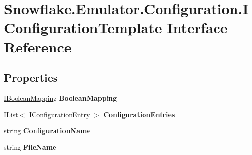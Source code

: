 \hypertarget{interface_snowflake_1_1_emulator_1_1_configuration_1_1_i_configuration_template}{}\section{Snowflake.\+Emulator.\+Configuration.\+I\+Configuration\+Template Interface Reference}
\label{interface_snowflake_1_1_emulator_1_1_configuration_1_1_i_configuration_template}
\subsection*{Properties}
\begin{DoxyCompactItemize}
\item 
\hypertarget{interface_snowflake_1_1_emulator_1_1_configuration_1_1_i_configuration_template_a4e057a915e16197d47e69fece7a6887c}{}\hyperlink{interface_snowflake_1_1_emulator_1_1_configuration_1_1_i_boolean_mapping}{I\+Boolean\+Mapping} {\bfseries Boolean\+Mapping}\label{interface_snowflake_1_1_emulator_1_1_configuration_1_1_i_configuration_template_a4e057a915e16197d47e69fece7a6887c}

\item 
\hypertarget{interface_snowflake_1_1_emulator_1_1_configuration_1_1_i_configuration_template_ae0e14f8c693702f9eb36937a451c5586}{}I\+List$<$ \hyperlink{interface_snowflake_1_1_emulator_1_1_configuration_1_1_i_configuration_entry}{I\+Configuration\+Entry} $>$ {\bfseries Configuration\+Entries}\label{interface_snowflake_1_1_emulator_1_1_configuration_1_1_i_configuration_template_ae0e14f8c693702f9eb36937a451c5586}

\item 
\hypertarget{interface_snowflake_1_1_emulator_1_1_configuration_1_1_i_configuration_template_a1995c6b9ee96aaddc007a6bb2879d023}{}string {\bfseries Configuration\+Name}\label{interface_snowflake_1_1_emulator_1_1_configuration_1_1_i_configuration_template_a1995c6b9ee96aaddc007a6bb2879d023}

\item 
\hypertarget{interface_snowflake_1_1_emulator_1_1_configuration_1_1_i_configuration_template_ab0245b0d407f118d3b0919fac5f4bfff}{}string {\bfseries File\+Name}\label{interface_snowflake_1_1_emulator_1_1_configuration_1_1_i_configuration_template_ab0245b0d407f118d3b0919fac5f4bfff}


\end{DoxyCompactItemize}
